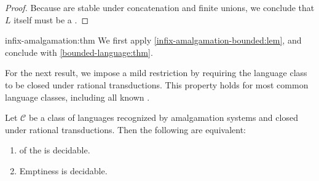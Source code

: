 \begin{proof}
    Because  are stable under concatenation and finite
    unions, we conclude that $L$ itself must be a .
\end{proof}

\begin{proofof}{infix-amalgamation:thm}
    We first apply \cref{infix-amalgamation-bounded:lem},
    and conclude with \cref{bounded-language:thm}.
\end{proofof}

For the next result, we impose a mild restriction by requiring the language class to be closed under rational transductions. This property holds for most common language classes, including all known .

\begin{theorem}
	\label{infix-wqo-is-emptiness:thm}
	Let $\mathcal{C}$ be a class of languages recognized by amalgamation systems and closed under rational transductions. Then the following are equivalent:
	
	\begin{enumerate}
		\item\label{wqo-infix-decidable}  of the  is decidable.
		\item\label{emptiness-decidable} Emptiness is decidable.
	\end{enumerate}
\end{theorem}

